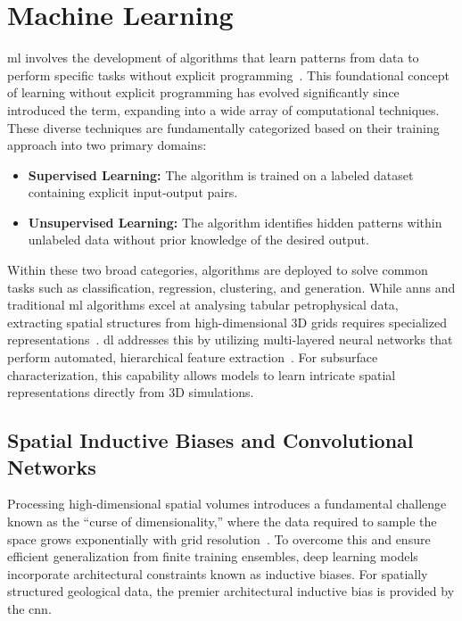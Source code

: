 \section{Machine Learning}\label{Sec:ML} 
\gls{ml} involves the development of algorithms that learn patterns from data to perform specific tasks without explicit programming~\parencite{goodfellow-et-al-2016}. This foundational concept of learning without explicit programming has evolved significantly since~\textcite{samuel1959some} introduced the term, expanding into a wide array of computational techniques. These diverse techniques are fundamentally categorized based on their training approach into two primary domains:
\begin{itemize}
\item \textbf{Supervised Learning:} The algorithm is trained on a labeled dataset containing explicit input-output pairs.
\item \textbf{Unsupervised Learning:} The algorithm identifies hidden patterns within unlabeled data without prior knowledge of the desired output.
\end{itemize}
Within these two broad categories, algorithms are deployed to solve common tasks such as classification, regression, clustering, and generation. While \glspl{ann} and traditional \gls{ml} algorithms excel at analysing tabular petrophysical data, extracting spatial structures from high-dimensional 3D grids requires specialized representations~\parencite{schaaf2019quantification}. \gls{dl} addresses this by utilizing multi-layered neural networks that perform automated, hierarchical feature extraction~\parencite{goodfellow-et-al-2016, lecun2015deep}. For subsurface characterization, this capability allows models to learn intricate spatial representations directly from 3D simulations.

\subsection{Spatial Inductive Biases and Convolutional Networks}
Processing high-dimensional spatial volumes introduces a fundamental challenge known as the ``curse of dimensionality,'' where the data required to sample the space grows exponentially with grid resolution~\parencite{prince2023understanding}. To overcome this and ensure efficient generalization from finite training ensembles, deep learning models incorporate architectural constraints known as inductive biases. For spatially structured geological data, the premier architectural inductive bias is provided by the \gls{cnn}.

